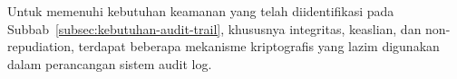 Untuk memenuhi kebutuhan keamanan yang telah diidentifikasi pada
Subbab~\ref{subsec:kebutuhan-audit-trail}, khususnya integritas,
keaslian, dan non-repudiation, terdapat beberapa mekanisme kriptografis
yang lazim digunakan dalam perancangan sistem audit log.

%
%
%
%
